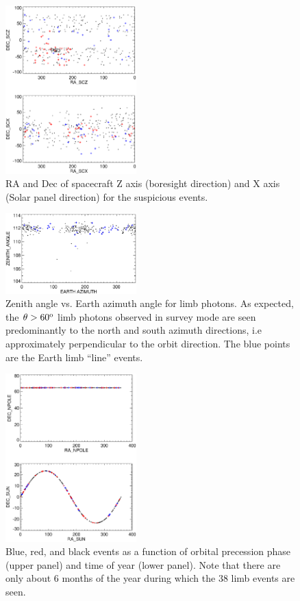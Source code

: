 \documentclass[aps,twocolumn,prd,superscriptaddress,showpacs,nofootinbib,fixfloat]{revtex4}
\newcommand{\degree}{^{\rm o}}
\begin{document}
\begin{figure}
  \centering
  \includegraphics[width=0.45\textwidth]{plots/spacecraft-zx.ps}
  \caption{RA and Dec of spacecraft Z axis (boresight
  direction) and X axis (Solar panel direction) for the
  suspicious events.  }
  \label{fig:spacecraft-zx}
\end{figure}

\begin{figure}
  \centering
  \includegraphics[width=0.45\textwidth]{plots/earth-az.ps}
  \caption{Zenith angle vs. Earth azimuth angle for limb
  photons.  As expected, the $\theta > 60\degree$ limb
  photons observed in survey mode are seen predominantly to
  the north and south azimuth directions, i.e approximately
  perpendicular to the orbit direction. The blue points are
  the Earth limb ``line'' events. }
  \label{fig:earth-az}
\end{figure}

\begin{figure}
  \centering
  \includegraphics[width=0.45\textwidth]{plots/sun.ps}
  \caption{Blue, red, and black events as a function of
  orbital precession phase (upper panel) and time of year
  (lower panel).  Note that there are only about 6 months of
  the year during which the 38 limb events are seen.}
  \label{fig:sun}
\end{figure}
\end{document}
